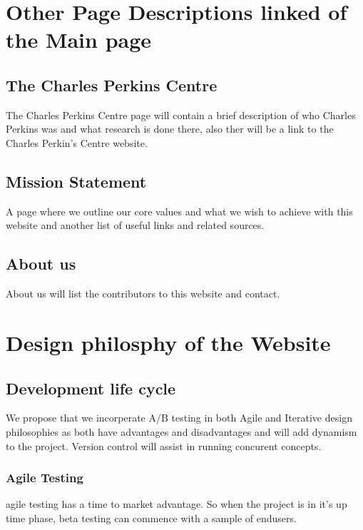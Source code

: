 \documentclass[letterpaper,12pt]{article}
\begin{document}
\section{Other Page Descriptions linked of the Main page}
\subsection{The Charles Perkins Centre}

The Charles Perkins Centre page will contain a brief description of who Charles Perkins was and what research is done there, also ther will be a link to the Charles Perkin's Centre website.

\subsection{Mission Statement} 

A page where we outline our core values and what we wish to achieve with this website and another list of useful links and related sources.


\subsection{About us}

About us will list the contributors to this website and contact.

\section{Design philosphy of the Website}

\subsection{Development life cycle}

We propose that we incorperate A/B testing in both Agile and Iterative design philosophies as both have advantages and disadvantages and will add dynamism to the project. Version control will assist in running concurent concepts. 

\subsubsection{Agile Testing}

\Gls{agile} testing has a time to market advantage. So when the project is in it's up time phase, beta testing can commence with a sample of endusers.
\end{document}
